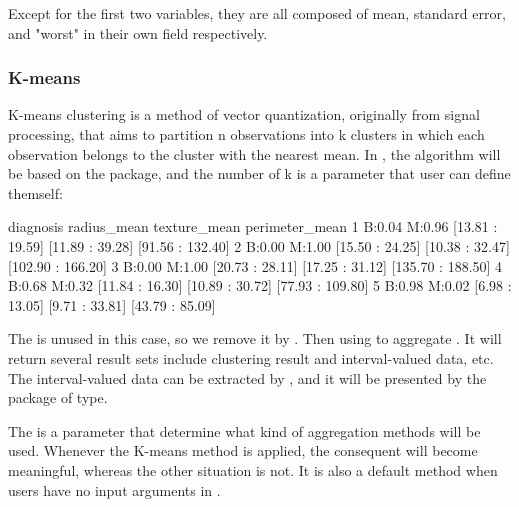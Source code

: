 \documentclass[article]{jss}
\begin{document}
Except for the first two variables, they are all composed of mean, standard error, and "worst" in their own field respectively.


\subsubsection{K-means}

K-means clustering is a method of vector quantization, originally from signal processing, that aims to partition n observations into k clusters in which each observation belongs to the cluster with the nearest mean. In , the algorithm will be based on the  package, and the number of k is a parameter that user can define themself:

\begin{CodeChunk}
\begin{CodeOutput}
  diagnosis     radius_mean     texture_mean    perimeter_mean
1 B:0.04 M:0.96 [13.81 : 19.59] [11.89 : 39.28] [91.56 : 132.40]
2 B:0.00 M:1.00 [15.50 : 24.25] [10.38 : 32.47] [102.90 : 166.20]
3 B:0.00 M:1.00 [20.73 : 28.11] [17.25 : 31.12] [135.70 : 188.50]
4 B:0.68 M:0.32 [11.84 : 16.30] [10.89 : 30.72] [77.93 : 109.80]
5 B:0.98 M:0.02 [6.98 : 13.05]  [9.71 : 33.81]  [43.79 : 85.09]
\end{CodeOutput}
\end{CodeChunk}

The  is unused in this case, so we remove it by  \cite{dplyr}. Then using  to aggregate . It will return several result sets include clustering result and interval-valued data, etc. The interval-valued data can be extracted by , and it will be presented by the package of  type.


The  is a parameter that determine what kind of aggregation methods will be used. Whenever the K-means method is applied, the consequent  will become meaningful, whereas the other situation is not. It is also a default method when users have no input arguments in .
\end{document}

